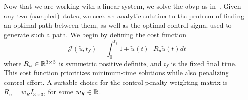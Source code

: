 Now that we are working with a linear system, we solve the \gls{obvp} as in~\cite{Schmerling2015}. Given any two (sampled) states, we seek an analytic solution to the problem of finding an optimal path between them, as well as the optimal control signal used to generate such a path. We begin by defining the cost function
\begin{equation}
    \mathcal{J}(\tilde{u}, t_{f}) = \int_0^{t_f} 1 + {\tilde{u}(t)}^\top R_u \tilde{u}(t) dt
\label{quad:eqn:cost}
\end{equation}
where $R_u \in \mathbb{R}^{3 \times 3}$ is symmetric positive definite, and $t_f$ is the fixed final time. This cost function prioritizes minimum-time solutions while also penalizing control effort. A suitable choice for the control penalty weighting matrix is $R_u = w_R I_{3 \times 3}$, for some $w_R \in \mathbb{R}$.

